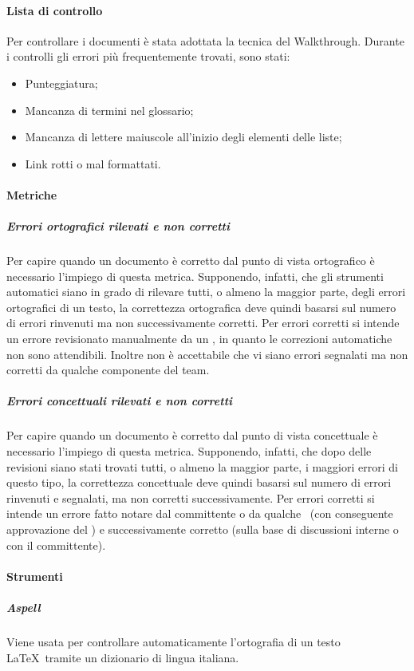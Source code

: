 \documentclass[../NormeDiProgetto_v4.0.0.tex]{subfiles}
\begin{document}
			\paragraph{Lista di controllo}
				Per controllare i documenti è stata adottata la tecnica del Walkthrough.
				Durante i controlli gli errori più frequentemente trovati, sono stati:
				\begin{itemize}
					\item Punteggiatura;
					\item Mancanza di termini nel glossario;
					\item Mancanza di lettere maiuscole all'inizio degli elementi delle liste;
					\item Link rotti o mal formattati.
				\end{itemize}

			\paragraph{Metriche}

				\subparagraph{Errori ortografici rilevati e non corretti}
				Per capire quando un documento è corretto dal punto di vista ortografico è necessario l'impiego di questa metrica. Supponendo, infatti, che gli strumenti automatici siano in grado di rilevare tutti, o almeno la maggior parte, degli errori ortografici di un testo, la correttezza ortografica deve quindi basarsi sul numero di errori rinvenuti ma non successivamente corretti. Per errori corretti si intende un errore revisionato manualmente da un \verificatore, in quanto le correzioni automatiche non sono attendibili. Inoltre non è accettabile che vi siano errori segnalati ma non corretti da qualche componente del team.

				\subparagraph{Errori concettuali rilevati e non corretti}
				Per capire quando un documento è corretto dal punto di vista concettuale è necessario l'impiego di questa metrica. Supponendo, infatti, che dopo delle revisioni siano stati trovati tutti, o almeno la maggior parte, i maggiori errori di questo tipo, la correttezza concettuale deve quindi basarsi sul numero di errori rinvenuti e segnalati, ma non corretti successivamente. Per errori corretti si intende un errore fatto notare dal committente o da qualche \verificatore\ (con conseguente approvazione del \responsabilediprogetto) e successivamente corretto (sulla base di discussioni interne o con il committente).\\

			\paragraph{Strumenti}
				\subparagraph{Aspell}
				Viene usata per controllare automaticamente l'ortografia di un testo \LaTeX\ tramite un dizionario di lingua italiana.
\end{document}
